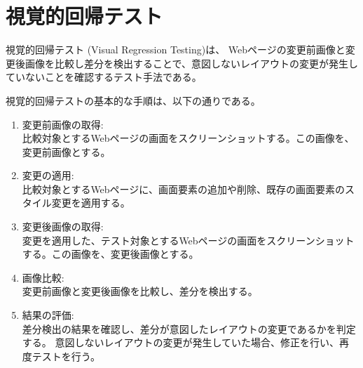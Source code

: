 \section{視覚的回帰テスト}\label{sec:vrt}
視覚的回帰テスト (Visual Regression Testing)\cite{VisualRegressionTesting}は、
Webページの変更前画像と変更後画像を比較し差分を検出することで、意図しないレイアウトの変更が発生していないことを確認するテスト手法である。\\
\par
視覚的回帰テストの基本的な手順は、以下の通りである。
\begin{enumerate}
      \setlength{\itemsep}{0pt}
            \setlength{\parsep}{0pt}
      \item 変更前画像の取得:\\
            比較対象とするWebページの画面をスクリーンショットする。この画像を、変更前画像とする。
      \item 変更の適用:\\
            比較対象とするWebページに、画面要素の追加や削除、既存の画面要素のスタイル変更を適用する。
      \item 変更後画像の取得:\\
            変更を適用した、テスト対象とするWebページの画面をスクリーンショットする。この画像を、変更後画像とする。
      \item 画像比較:\\
            変更前画像と変更後画像を比較し、差分を検出する。
      \item 結果の評価:\\
            差分検出の結果を確認し、差分が意図したレイアウトの変更であるかを判定する。
            意図しないレイアウトの変更が発生していた場合、修正を行い、再度テストを行う。
\end{enumerate}

